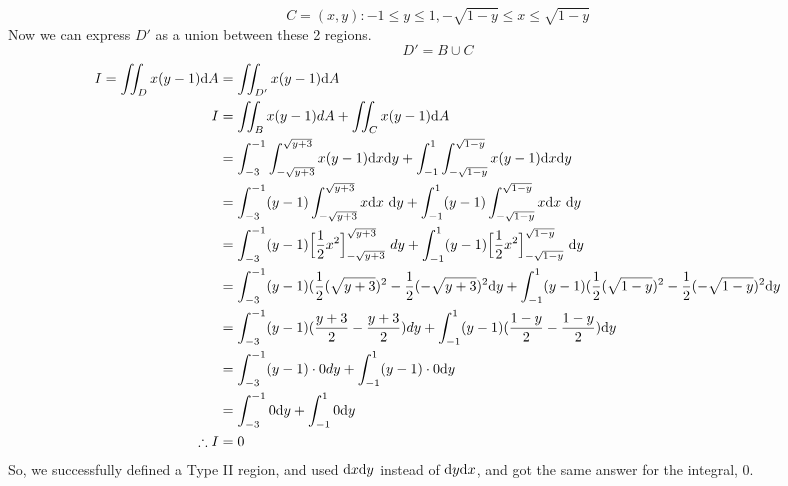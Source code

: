 \documentclass[a4paper,12pt]{report}
\begin{document}
$$
C = {(x, y): -1 \leq y \leq 1, -\sqrt{1-y} \leq x \leq \sqrt{1 - y}}
$$
Now we can express $D'$ as a union between these 2 regions.
$$
D' = B \cup C
$$
\begin{align*}
    I = \iint_D x(y-1) \mathrm{d} A &= \iint_{D'}x(y-1)\mathrm{d} A \\
    I &= \iint_B x(y-1)dA + \iint_Cx(y-1)\mathrm{d} A \\
    &= \int_{-3}^{-1} \int_{-\sqrt{y + 3}}^{\sqrt{y+3}} x(y-1) \mathrm{d} x\mathrm{d} y + \int_{-1}^{1} \int_{-\sqrt{1-y}}^{\sqrt{1-y}} x(y-1) \mathrm{d} x\mathrm{d} y \\
    &= \int_{-3}^{-1} (y-1)\int_{-\sqrt{y + 3}}^{\sqrt{y+3}} x \mathrm{d} x \ \mathrm{d} y + \int_{-1}^{1} (y-1)\int_{-\sqrt{1-y}}^{\sqrt{1-y}} x \mathrm{d} x \ \mathrm{d} y \\
    &= \int_{-3}^{-1} (y-1) \Big[ \frac{1}{2} x^2 \Big]_{-\sqrt{y + 3}}^{\sqrt{y + 3}}\ dy + \int_{-1}^{1} (y-1) \Big[ \frac{1}{2} x^2 \Big]_{-\sqrt{1-y}}^{\sqrt{1 -y}}\ \mathrm{d} y \\
    &= \int_{-3}^{-1} (y-1) (\frac{1}{2}(\sqrt{y+3})^2 - \frac{1}{2}(-\sqrt{y+3})^2 \mathrm{d} y + \int_{-1}^{1} (y-1) (\frac{1}{2}(\sqrt{1-y})^2 - \frac{1}{2}(-\sqrt{1-y})^2 \mathrm{d} y \\
    &= \int_{-3}^{-1} (y-1) (\frac{y+3}{2}  - \frac{y + 3}{2}) dy + \int_{-1}^{1} (y-1) (\frac{1-y}{2}  - \frac{1-y}{2}) \mathrm{d} y \\
    &= \int_{-3}^{-1} (y-1) \cdot 0 dy + \int_{-1}^{1} (y-1) \cdot 0 \mathrm{d} y \\
    &= \int_{-3}^{-1} 0 \mathrm{d} y + \int_{-1}^{1} 0\mathrm{d} y \\
  \therefore I &= 0 \\
\end{align*}
So, we successfully defined a Type II region, and used $\mathrm{d} x\mathrm{d} y$ instead of $\mathrm{d} y\mathrm{d} x$, and got the same answer for the integral, $0$.

\newpage
\end{document}
